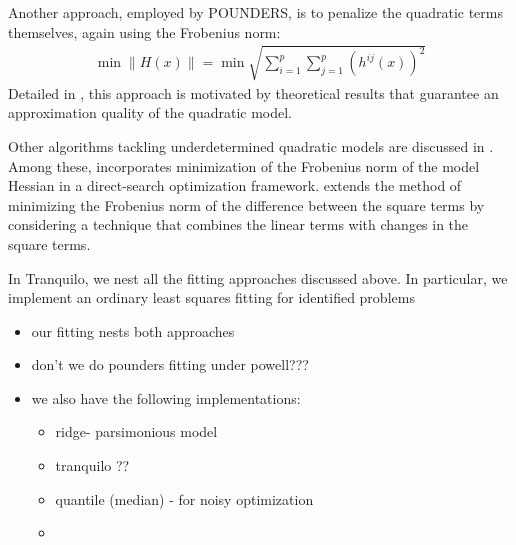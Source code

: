Another approach, employed by POUNDERS, is to penalize the quadratic terms themselves, again using the Frobenius norm:
\begin{align}
\min\lVert H(x)\rVert =\min\sqrt{\sum\limits_{i=1}^p\sum\limits_{j=1}^{p}(h^{ij}(x))^2}
\label{eq:min-frob}
\end{align}
Detailed in \cite{Wild2008}, this approach is motivated by theoretical results that guarantee an approximation quality of the quadratic model.

Other algorithms tackling underdetermined quadratic models are discussed in \cite{Larson2019}. Among these, \cite{Custdio2009} incorporates minimization of the Frobenius norm of the model Hessian in a direct-search optimization framework. \cite{Powell2012} extends the method of minimizing the Frobenius norm of the difference between the square terms by considering a technique that combines the linear terms with changes in the square terms.

In Tranquilo, we nest all the fitting approaches discussed above. In particular, we implement an ordinary least squares fitting for identified problems
\begin{itemize}
    \item our fitting nests both approaches
    \item don't we do pounders fitting under powell???
    \item we also have the following implementations:
     \begin{itemize}
        \item ridge- parsimonious model
        \item tranquilo ??
        \item quantile (median) - for noisy optimization
        \item
     \end{itemize}
\end{itemize}
